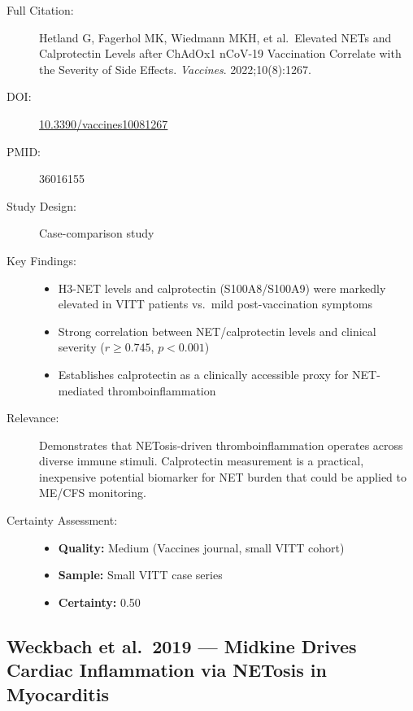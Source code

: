 \begin{description}
    \item[Full Citation:] Hetland G, Fagerhol MK, Wiedmann MKH, et al.\ Elevated NETs and Calprotectin Levels after ChAdOx1 nCoV-19 Vaccination Correlate with the Severity of Side Effects. \textit{Vaccines}. 2022;10(8):1267. \cite{Hetland2022}
    \item[DOI:] \href{https://doi.org/10.3390/vaccines10081267}{10.3390/vaccines10081267}
    \item[PMID:] 36016155
    \item[Study Design:] Case-comparison study
    \item[Key Findings:]
    \begin{itemize}
        \item H3-NET levels and calprotectin (S100A8/S100A9) were markedly elevated in VITT patients vs.\ mild post-vaccination symptoms
        \item Strong correlation between NET/calprotectin levels and clinical severity ($r \geq 0.745$, $p < 0.001$)
        \item Establishes calprotectin as a clinically accessible proxy for NET-mediated thromboinflammation
    \end{itemize}
    \item[Relevance:] Demonstrates that NETosis-driven thromboinflammation operates across diverse immune stimuli. Calprotectin measurement is a practical, inexpensive potential biomarker for NET burden that could be applied to ME/CFS monitoring.
    \item[Certainty Assessment:]
    \begin{itemize}
        \item \textbf{Quality:} Medium (Vaccines journal, small VITT cohort)
        \item \textbf{Sample:} Small VITT case series
        \item \textbf{Certainty:} 0.50
    \end{itemize}
\end{description}

\subsection{Weckbach et al.\ 2019 --- Midkine Drives Cardiac Inflammation via NETosis in Myocarditis}

